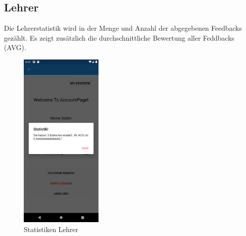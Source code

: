 \subsection{Lehrer}
Die Lehrerstatistik wird in der Menge und Anzahl der abgegebenen Feedbacks gezählt. Es zeigt zusätzlich die durchschnittliche Bewertung aller Feddbacks (AVG).
\begin{figure}[h]
    \begin{center}
        \includegraphics[width=4cm]{pics/Xamarin Lehrer/1 Stat.png}\hfill
        \caption[Statistiken]{Statistiken Lehrer}
        \end{center}
\end{figure}
\newpage